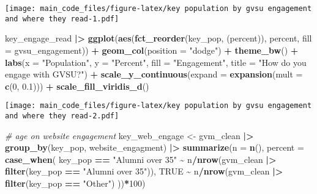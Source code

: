\documentclass[
]{article}
\newenvironment{Shaded}{\begin{snugshade}}{\end{snugshade}}
\newcommand{\AttributeTok}[1]{\textcolor[rgb]{0.13,0.29,0.53}{#1}}
\newcommand{\CommentTok}[1]{\textcolor[rgb]{0.56,0.35,0.01}{\textit{#1}}}
\newcommand{\ConstantTok}[1]{\textcolor[rgb]{0.56,0.35,0.01}{#1}}
\newcommand{\DecValTok}[1]{\textcolor[rgb]{0.00,0.00,0.81}{#1}}
\newcommand{\FloatTok}[1]{\textcolor[rgb]{0.00,0.00,0.81}{#1}}
\newcommand{\FunctionTok}[1]{\textcolor[rgb]{0.13,0.29,0.53}{\textbf{#1}}}
\newcommand{\NormalTok}[1]{#1}
\newcommand{\OtherTok}[1]{\textcolor[rgb]{0.56,0.35,0.01}{#1}}
\newcommand{\SpecialCharTok}[1]{\textcolor[rgb]{0.81,0.36,0.00}{\textbf{#1}}}
\newcommand{\StringTok}[1]{\textcolor[rgb]{0.31,0.60,0.02}{#1}}
\begin{document}
\texttt{[image: main\_code\_files/figure-latex/key population by gvsu engagement and where they read-1.pdf]}

\begin{Shaded}
\begin{Highlighting}[]
\NormalTok{key\_engage\_read }\SpecialCharTok{|\textgreater{}}
  \FunctionTok{ggplot}\NormalTok{(}\FunctionTok{aes}\NormalTok{(}\FunctionTok{fct\_reorder}\NormalTok{(key\_pop, (percent)), percent, }\AttributeTok{fill =}\NormalTok{ gvsu\_engagement)) }\SpecialCharTok{+}
  \FunctionTok{geom\_col}\NormalTok{(}\AttributeTok{position =} \StringTok{"dodge"}\NormalTok{) }\SpecialCharTok{+}
  \FunctionTok{theme\_bw}\NormalTok{() }\SpecialCharTok{+}
  \FunctionTok{labs}\NormalTok{(}\AttributeTok{x =} \StringTok{"Population"}\NormalTok{, }\AttributeTok{y =} \StringTok{"Percent"}\NormalTok{, }\AttributeTok{fill =} \StringTok{"Engagement"}\NormalTok{, }\AttributeTok{title =} \StringTok{"How do you engage with GVSU?"}\NormalTok{) }\SpecialCharTok{+}
  \FunctionTok{scale\_y\_continuous}\NormalTok{(}\AttributeTok{expand =} \FunctionTok{expansion}\NormalTok{(}\AttributeTok{mult =} \FunctionTok{c}\NormalTok{(}\DecValTok{0}\NormalTok{, }\FloatTok{0.1}\NormalTok{))) }\SpecialCharTok{+}
  \FunctionTok{scale\_fill\_viridis\_d}\NormalTok{()}
\end{Highlighting}
\end{Shaded}

\texttt{[image: main\_code\_files/figure-latex/key population by gvsu engagement and where they read-2.pdf]}

\begin{Shaded}
\begin{Highlighting}[]
\CommentTok{\# age on website engagement}
\NormalTok{key\_web\_engage }\OtherTok{\textless{}{-}}\NormalTok{ gvm\_clean }\SpecialCharTok{|\textgreater{}}
  \FunctionTok{group\_by}\NormalTok{(key\_pop, website\_engagment) }\SpecialCharTok{|\textgreater{}}
  \FunctionTok{summarize}\NormalTok{(}\AttributeTok{n =} \FunctionTok{n}\NormalTok{(),}
            \AttributeTok{percent =} \FunctionTok{case\_when}\NormalTok{(}
\NormalTok{              key\_pop }\SpecialCharTok{==} \StringTok{"Alumni over 35"} \SpecialCharTok{\textasciitilde{}}\NormalTok{ n}\SpecialCharTok{/}\FunctionTok{nrow}\NormalTok{(gvm\_clean }\SpecialCharTok{|\textgreater{}} \FunctionTok{filter}\NormalTok{(key\_pop }\SpecialCharTok{==} \StringTok{"Alumni over 35"}\NormalTok{)),}
              \ConstantTok{TRUE} \SpecialCharTok{\textasciitilde{}}\NormalTok{ n}\SpecialCharTok{/}\FunctionTok{nrow}\NormalTok{(gvm\_clean }\SpecialCharTok{|\textgreater{}} \FunctionTok{filter}\NormalTok{(key\_pop }\SpecialCharTok{==} \StringTok{"Other"}\NormalTok{)}
\NormalTok{            ))}\SpecialCharTok{*}\DecValTok{100}\NormalTok{)}
\end{Highlighting}
\end{Shaded}
\end{document}
